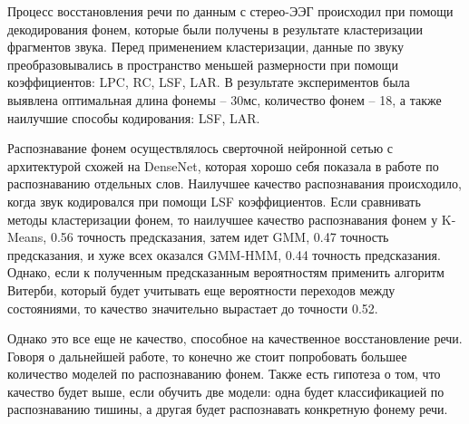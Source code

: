 \documentclass[a4paper,14pt]{extarticle}
\begin{document}
Процесс восстановления речи по данным с стерео-ЭЭГ происходил при помощи декодирования фонем, которые были получены в результате кластеризации фрагментов звука. Перед применением кластеризации, данные по звуку преобразовывались в пространство меньшей размерности при помощи коэффициентов: LPC, RC, LSF, LAR. В результате экспериментов была выявлена оптимальная длина фонемы – 30мс, количество фонем – 18, а также наилучшие способы кодирования: LSF, LAR.

Распознавание фонем осуществлялось сверточной нейронной сетью с архитектурой схожей на DenseNet, которая хорошо себя показала в работе по распознаванию отдельных слов. Наилучшее качество распознавания происходило, когда звук кодировался при помощи LSF коэффициентов. Если сравнивать методы кластеризации фонем, то наилучшее качество распознавания фонем у K-Means, 0.56 точность предсказания, затем идет GMM, 0.47 точность предсказания, и хуже всех оказался GMM-HMM, 0.44 точность предсказания. Однако, если к полученным предсказанным вероятностям применить алгоритм Витерби, который будет учитывать еще вероятности переходов между состояниями, то качество значительно вырастает до точности 0.52.

Однако это все еще не качество, способное на качественное восстановление речи. Говоря о дальнейшей работе, то конечно же стоит попробовать большее количество моделей по распознаванию фонем. Также есть гипотеза о том, что качество будет выше, если обучить две модели: одна будет классификацией по распознаванию тишины, а другая будет распознавать конкретную фонему речи.
\end{document}
